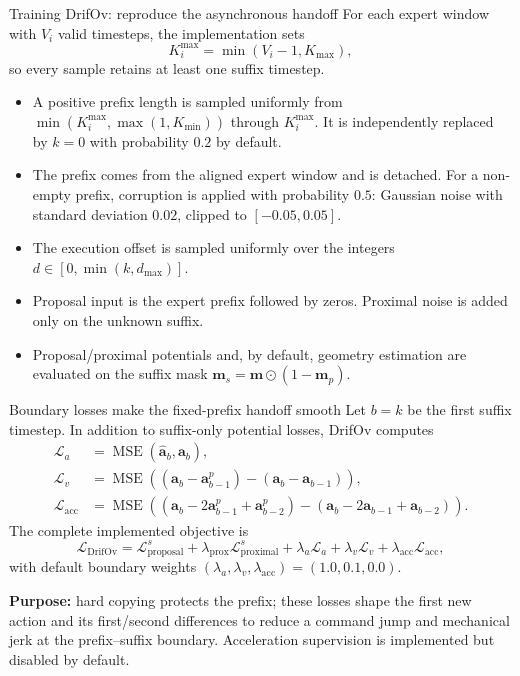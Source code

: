 \documentclass[aspectratio=169,10pt]{beamer}
\newcommand{\vect}[1]{\mathbf{#1}}
\begin{document}
\begin{frame}{Training DrifOv: reproduce the asynchronous handoff}
  \small
  For each expert window with $V_i$ valid timesteps, the implementation sets
  \[
    K_i^{\max}
      =\min(V_i-1,K_{\max}),
  \]
  so every sample retains at least one suffix timestep.

  \begin{itemize}
    \item A positive prefix length is sampled uniformly from
          $\min(K_i^{\max},\max(1,K_{\min}))$ through $K_i^{\max}$.
          It is independently replaced by $k=0$ with probability $0.2$ by default.
    \item The prefix comes from the aligned expert window and is detached.
          For a non-empty prefix, corruption is applied with probability $0.5$:
          Gaussian noise with standard deviation $0.02$, clipped to
          $[-0.05,0.05]$.
    \item The execution offset is sampled uniformly over the integers
          $d\in[0,\min(k,d_{\max})]$.
    \item Proposal input is the expert prefix followed by zeros. Proximal noise
          is added only on the unknown suffix.
    \item Proposal/proximal potentials and, by default, geometry estimation are
          evaluated on the suffix mask
          $\vect{m}_s=\vect{m}\odot(1-\vect{m}_p)$.
  \end{itemize}
\end{frame}

\begin{frame}{Boundary losses make the fixed-prefix handoff smooth}
  \small
  Let $b=k$ be the first suffix timestep. In addition to suffix-only potential
  losses, DrifOv computes
  \begin{align*}
    \mathcal{L}_{a}
      &= \operatorname{MSE}(\hat{\vect{a}}_b,\vect{a}_b),\\
    \mathcal{L}_{v}
      &= \operatorname{MSE}\!\left(
           (\hat{\vect{a}}_b-\vect{a}^{p}_{b-1})
           -(\vect{a}_b-\vect{a}_{b-1})
         \right),\\
    \mathcal{L}_{\mathrm{acc}}
      &= \operatorname{MSE}\!\left(
           (\hat{\vect{a}}_b-2\vect{a}^{p}_{b-1}+\vect{a}^{p}_{b-2})
           -(\vect{a}_b-2\vect{a}_{b-1}+\vect{a}_{b-2})
         \right).
  \end{align*}
  The complete implemented objective is
  \[
    \mathcal{L}_{\mathrm{DrifOv}}
      =
      \mathcal{L}_{\mathrm{proposal}}^{s}
      +\lambda_{\mathrm{prox}}\mathcal{L}_{\mathrm{proximal}}^{s}
      +\lambda_a\mathcal{L}_a
      +\lambda_v\mathcal{L}_v
      +\lambda_{\mathrm{acc}}\mathcal{L}_{\mathrm{acc}},
  \]
  with default boundary weights $(\lambda_a,\lambda_v,\lambda_{\mathrm{acc}})
  =(1.0,0.1,0.0)$.

  \textbf{Purpose:} hard copying protects the prefix; these losses shape the
  first new action and its first/second differences to reduce a command jump and
  mechanical jerk at the prefix--suffix boundary. Acceleration supervision is
  implemented but disabled by default.
\end{frame}
\end{document}
